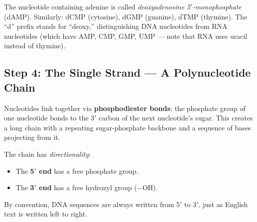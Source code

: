 \begin{example}
The nucleotide containing adenine is called \emph{deoxyadenosine 5$'$-monophosphate} (dAMP). Similarly: dCMP (cytosine), dGMP (guanine), dTMP (thymine). The ``d'' prefix stands for ``deoxy,'' distinguishing DNA nucleotides from RNA nucleotides (which have AMP, CMP, GMP, UMP --- note that RNA uses uracil instead of thymine).
\end{example}

\subsection{Step 4: The Single Strand --- A Polynucleotide Chain}
\label{subsec:single-strand}

Nucleotides link together via \textbf{phosphodiester bonds}: the phosphate group of one nucleotide bonds to the 3$'$ carbon of the next nucleotide's sugar. This creates a long chain with a repeating sugar-phosphate backbone and a sequence of bases projecting from it.

The chain has \emph{directionality}:
\begin{itemize}[leftmargin=1.8em]
  \item The \textbf{5$'$ end} has a free phosphate group.
  \item The \textbf{3$'$ end} has a free hydroxyl group ($-$OH).
\end{itemize}

By convention, DNA sequences are always written from 5$'$ to 3$'$, just as English text is written left to right.

